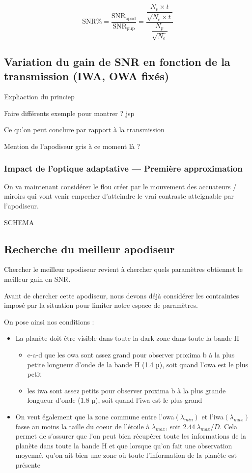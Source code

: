 \[\text{SNR\%}=\frac{\text{SNR}_\text{apod}}{\text{SNR}_\text{pup}}=\dfrac{\dfrac{N_p\times t}{\sqrt{N_e\times t}}}{\dfrac{N_p}{\sqrt{N_e}}}\]

\subsection{Variation du gain de SNR en fonction de la transmission (IWA, OWA fixés)}

Expliaction du princiep

Faire différents exemple pour montrer ? jsp 

Ce qu'on peut conclure par rapport à la transmission 

Mention de l'apodiseur gris à ce moment là ? 

\subsubsection{Impact de l'optique adaptative — Première approximation}

On va maintenant considérer le flou créer par le mouvement des accuateurs / miroirs qui vont venir empecher d'atteindre le vrai contraste atteignable par l'apodiseur.

SCHEMA

\subsection{Recherche du meilleur apodiseur}

Chercher le meilleur apodiseur revient à chercher quels paramètres obtiennet le meilleur gain en SNR.

Avant de chercher cette apodiseur, nous devons déjà considérer les contraintes imposé par la situation pour limiter notre espace de paramètres.

On pose ainsi nos conditions :

\begin{itemize}[label=\textendash]
    \item La planète doit être visible dans toute la dark zone dans toute la bande H
        \begin{itemize}
            \item c-a-d que les owa sont assez grand pour observer proxima b à la plus petite longueur d’onde de la bande H (1.4 µ), soit quand l’owa est le plus petit
            \item les iwa sont assez petits pour observer proxima b à la plus grande longueur d’onde (1.8 µ), soit quand l’iwa est le plus grand
        \end{itemize}
    \item On veut également que la zone commune entre l’owa$(\lambda _{min})$ et l’iwa$(\lambda_{max})$ fasse au moins la taille du coeur de l’étoile à $\lambda _{max}$, soit $2.44\: \lambda_{max}/D$. Cela permet de s’assurer que l’on peut bien récupérer toute les informations de la planète dans toute la bande H et que lorsque qu’on fait une observation moyenné, qu’on ait bien une zone où toute l'information de la planète est présente
\end{itemize}

